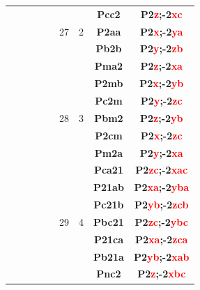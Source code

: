 \documentclass{article}      %
\begin{document}
\begin{small}
\begin{longtable}[c]{|c|c|c|c|c|c|c|c|c|}
          &  & & & &  & &\textbf{Pcc2}         &\textbf{P2\textcolor{red}{z};-2\textcolor{red}{xc}}\\\cline{8-9}          
	  &  & & & &\textrm{27}  &\textrm{2} &\textbf{P2aa}         &\textbf{P2\textcolor{red}{x};-2\textcolor{red}{ya}}\\\cline{8-9}          
          &  & & & &  & &\textbf{Pb2b}         &\textbf{P2\textcolor{red}{y};-2\textcolor{red}{zb}}\\\cline{6-9}          
          &  & & & &  & &\textbf{Pma2}         &\textbf{P2\textcolor{red}{z};-2\textcolor{red}{xa}}\\\cline{8-9}          
          &  & & & &  & &\textbf{P2mb}         &\textbf{P2\textcolor{red}{x};-2\textcolor{red}{yb}}\\\cline{8-9}          
          &  & & & &  & &\textbf{Pc2m}         &\textbf{P2\textcolor{red}{y};-2\textcolor{red}{zc}}\\\cline{8-9}          
	  &  & & & &\textrm{28}  &\textrm{3} &\textbf{Pbm2}         &\textbf{P2\textcolor{red}{z};-2\textcolor{red}{yb}}\\\cline{8-9}          
          &  & & & &  & &\textbf{P2cm}         &\textbf{P2\textcolor{red}{x};-2\textcolor{red}{zc}}\\\cline{8-9}          
          &  & & & &  & &\textbf{Pm2a}         &\textbf{P2\textcolor{red}{y};-2\textcolor{red}{xa}}\\\cline{6-9}        
          &  & & & &  & &\textbf{Pca21}       &\textbf{P2\textcolor{red}{zc};-2\textcolor{red}{xac}}\\\cline{8-9}        
          &  & & & &  & &\textbf{P21ab}       &\textbf{P2\textcolor{red}{xa};-2\textcolor{red}{yba}}\\\cline{8-9}        
          &  & & & &  & &\textbf{Pc21b}       &\textbf{P2\textcolor{red}{yb};-2\textcolor{red}{zcb}}\\\cline{8-9}        
	  &  & & & &\textrm{29}  &\textrm{4} &\textbf{Pbc21}       &\textbf{P2\textcolor{red}{zc};-2\textcolor{red}{ybc}}\\\cline{8-9}        
          &  & & & &  & &\textbf{P21ca}       &\textbf{P2\textcolor{red}{xa};-2\textcolor{red}{zca}}\\\cline{8-9}        
          &  & & & &  & &\textbf{Pb21a}       &\textbf{P2\textcolor{red}{yb};-2\textcolor{red}{xab}}\\\cline{6-9}        
          &  & & & &  & &\textbf{Pnc2}         &\textbf{P2\textcolor{red}{z};-2\textcolor{red}{xbc}}\\\cline{8-9}         

\end{longtable}
\end{small}
\end{document}
